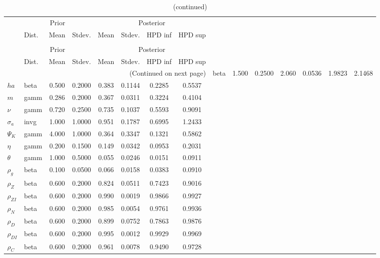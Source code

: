  
\begin{center}
\begin{longtable}{llcccccc} 
\caption{Results from Metropolis-Hastings (parameters)}
 \label{Table:MHPosterior:1}\\
\toprule 
  & \multicolumn{3}{c}{Prior}  &  \multicolumn{4}{c}{Posterior} \\
  \cmidrule(r{.75em}){2-4} \cmidrule(r{.75em}){5-8}
  & Dist. & Mean  & Stdev. & Mean & Stdev. & HPD inf & HPD sup\\
\midrule \endfirsthead 
\caption{(continued)}\\\toprule 
  & \multicolumn{3}{c}{Prior}  &  \multicolumn{4}{c}{Posterior} \\
  \cmidrule(r{.75em}){2-4} \cmidrule(r{.75em}){5-8}
  & Dist. & Mean  & Stdev. & Mean & Stdev. & HPD inf & HPD sup\\
\midrule \endhead 
\bottomrule \multicolumn{8}{r}{(Continued on next page)} \endfoot 
\bottomrule \endlastfoot 
${\gamma}$ & beta &   1.500 & 0.2500 &   2.060& 0.0536 &  1.9823 &  2.1468 \\ 
${ha}$ & beta &   0.500 & 0.2000 &   0.383& 0.1144 &  0.2285 &  0.5537 \\ 
${m}$ & gamm &   0.286 & 0.2000 &   0.367& 0.0311 &  0.3224 &  0.4104 \\ 
$\nu$ & gamm &   0.720 & 0.2500 &   0.735& 0.1037 &  0.5593 &  0.9091 \\ 
${\sigma_a}$ & invg &   1.000 & 1.0000 &   0.951& 0.1787 &  0.6995 &  1.2433 \\ 
${\Psi_K}$ & gamm &   4.000 & 1.0000 &   0.364& 0.3347 &  0.1321 &  0.5862 \\ 
${\eta}$ & gamm &   0.200 & 0.1500 &   0.149& 0.0342 &  0.0953 &  0.2031 \\ 
${\theta}$ & gamm &   1.000 & 0.5000 &   0.055& 0.0246 &  0.0151 &  0.0911 \\ 
${\rho_g}$ & beta &   0.100 & 0.0500 &   0.066& 0.0158 &  0.0383 &  0.0910 \\ 
${\rho_Z}$ & beta &   0.600 & 0.2000 &   0.824& 0.0511 &  0.7423 &  0.9016 \\ 
${\rho_{ZI}}$ & beta &   0.600 & 0.2000 &   0.990& 0.0019 &  0.9866 &  0.9927 \\ 
${\rho_N}$ & beta &   0.600 & 0.2000 &   0.985& 0.0054 &  0.9761 &  0.9936 \\ 
${\rho_D}$ & beta &   0.600 & 0.2000 &   0.899& 0.0752 &  0.7863 &  0.9876 \\ 
${\rho_{DI}}$ & beta &   0.600 & 0.2000 &   0.995& 0.0012 &  0.9929 &  0.9969 \\ 
${\rho_C}$ & beta &   0.600 & 0.2000 &   0.961& 0.0078 &  0.9490 &  0.9728 \\ 
\end{longtable}
 \end{center}
